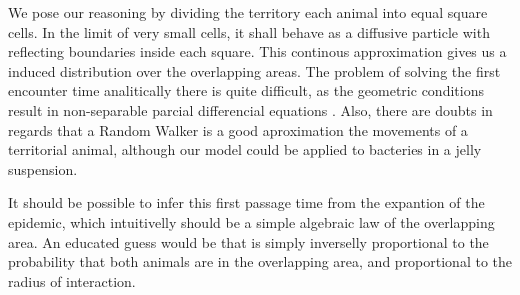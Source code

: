 \documentclass[letterpaperr,12pt]{article}
\begin{document}
We pose
our reasoning by dividing the territory each animal into equal 
square cells. In the limit of very small cells, 
it shall behave as a diffusive particle with reflecting boundaries
inside each square. This continous approximation gives us a
induced distribution over the overlapping areas. The problem
of solving the first encounter time analitically there
is quite difficult, as the geometric conditions result in
non-separable parcial differencial equations \cite{NotasAnteriores}. 
Also, there are doubts in regards that a Random Walker is
a good aproximation the movements of a territorial animal,
although our model could be applied to bacteries in a jelly
suspension.

It should be possible to infer this first passage time
from the expantion of the epidemic, which intuitivelly should
be a simple algebraic law of the overlapping area. An educated
guess would be that is simply inverselly proportional to
the probability that both animals are in the overlapping
area, and proportional to the radius of interaction.
\end{document}
